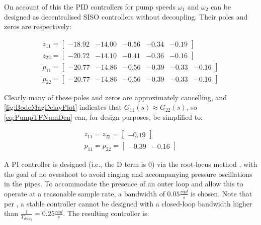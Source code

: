 On account of this the PID controllers for pump speeds $\omega_1$ and $\omega_2$ can be designed as decentralised SISO controllers without decoupling. Their poles and zeros are respectively:

\begin{equation}\label{eq:PumpTFNumDen}
	\begin{gathered}
		z_{11} = \begin{bmatrix}-18.92 & -14.00 & -0.56 & -0.34 & -0.19	\end{bmatrix} \\
		z_{22} = \begin{bmatrix}-20.72 & -14.10 & -0.41 & -0.36 & -0.16	\end{bmatrix} \\
		p_{11} = \begin{bmatrix}-20.77 & -14.86 & -0.56 & -0.39 & -0.33 & -0.16\end{bmatrix} \\
		p_{22} = \begin{bmatrix}-20.77 & -14.86 & -0.56 & -0.39 & -0.33 & -0.16\end{bmatrix}
	\end{gathered}
\end{equation}

Clearly many of these poles and zeros are approximately cancelling, and \cref{fig:BodeMagDelayPlot} indicates that $G_{11}(s) \approx G_{22}(s)$, so \cref{eq:PumpTFNumDen} can, for design purposes, be simplified to:

\begin{equation}\label{eq:PumpTFSimple}
	\begin{gathered}
		z_{11} = z_{22} = \begin{bmatrix}-0.19\end{bmatrix} \\
		p_{11} = p_{22} = \begin{bmatrix}-0.39 & -0.16 \end{bmatrix}
	\end{gathered}
\end{equation}

A PI controller is designed (i.e., the D term is $0$) via the root-locus method \cite{Franklin}, with the goal of no overshoot to avoid ringing and accompanying pressure oscillations in the pipes. To accommodate the presence of an outer loop and allow this to operate at a reasonable sample rate, a bandwidth of $0.05 \frac{\si{rad}}{\si{s}}$ is chosen. Note that per \cite{Skogestad2005}, a stable controller cannot be designed with a closed-loop bandwidth higher than $\frac{1}{T_{delay}} = 0.25 \frac{\si{rad}}{\si{s}}$. The resulting controller is:

